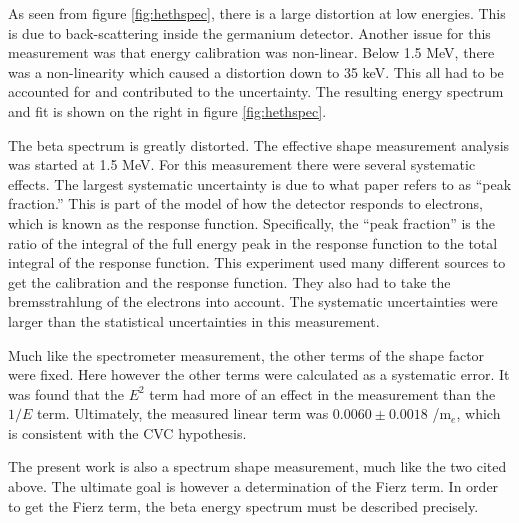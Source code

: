 \documentclass[../MaxHughesThesis.tex]{subfiles}
\begin{document}
As seen from figure \ref{fig:hethspec}, there is a large distortion at low energies.
This is due to back-scattering inside the germanium detector.
Another issue for this measurement was that energy calibration was non-linear.
Below 1.5 MeV, there was a non-linearity which caused a distortion down to 35 keV. 
This all had to be accounted for and contributed to the uncertainty.
The resulting energy spectrum and fit is shown on the right in figure \ref{fig:hethspec}.


The beta spectrum is greatly distorted.
The effective shape measurement analysis was started at 1.5 MeV.
For this measurement there were several systematic effects.
The largest systematic uncertainty is due to what  paper refers  to as ``peak fraction.''
This is part of the model of how the detector responds to electrons, which is known as the response function.
Specifically, the ``peak fraction'' is the ratio of the integral of the full energy peak in the response function to the total integral of the response function. 
This experiment used many different sources to get the calibration and the response function.
They also had to take the bremsstrahlung of the electrons into account.
The systematic uncertainties were larger than the statistical uncertainties in this measurement. 

Much like the spectrometer measurement, the other terms of the shape factor were fixed.
Here however the other terms were calculated as a systematic error.
It was found that the $E^{2}$ term had more of an effect in the measurement than the $1/E$ term.
Ultimately, the measured linear term was $0.0060 \pm 0.0018$ /m$_{e}$, which is consistent with the CVC hypothesis. 

The present work is also a spectrum shape measurement, much like the two cited above.
The ultimate goal is however a  determination of the Fierz term. 
In order to get the Fierz term, the beta energy spectrum must be described precisely.
\end{document}
